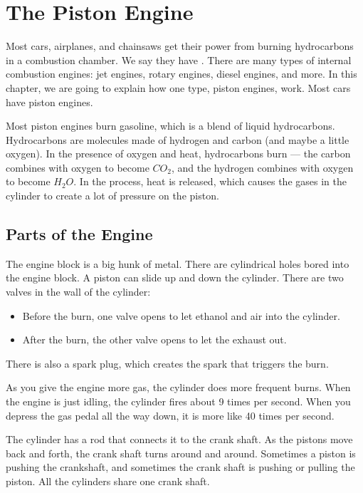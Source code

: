\chapter{The Piston Engine}

Most cars,  airplanes,  and chainsaws get their power from burning hydrocarbons in a 
combustion chamber.   We say they have .   There are many types of internal combustion engines: jet engines, rotary engines, diesel engines, and more.  In this chapter, we are 
going to explain how one type,  piston engines, work.   Most cars have piston engines.

Most piston engines burn gasoline,  which is a blend of liquid hydrocarbons.  Hydrocarbons are molecules made of hydrogen and carbon (and maybe a little oxygen).  In the presence of oxygen and heat,  hydrocarbons burn --- the carbon combines with oxygen to become $CO_2$, and the hydrogen combines with oxygen to become $H_2O$.  In the process, heat is released, which causes the gases in the cylinder to create a lot of pressure on the piston.


\section{Parts of the Engine}

The engine block is a big hunk of metal.  There are cylindrical holes bored into the engine block.  A piston can slide up and down the cylinder.  There are two valves in the wall of the cylinder:  
\begin{itemize}
\item Before the burn, one valve opens to let ethanol and air into the cylinder.
\item After the burn,  the other valve opens to let the exhaust out.
\end{itemize}

There is also a spark plug, which creates the spark that triggers the burn.

As you give the engine more gas,  the cylinder does more frequent burns.  When the engine is just idling,  the cylinder fires about 9 times per second.  When you depress the gas pedal all the way down,  it is more like 40 times per second.

The cylinder has a rod that connects it to the crank shaft. As the pistons move back and forth,  the crank shaft turns around and around.  Sometimes a piston is pushing the crankshaft, and sometimes the crank shaft is pushing or pulling the piston.  All the cylinders share one crank shaft.

